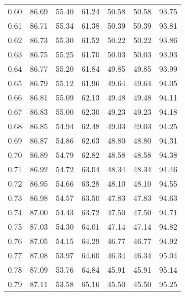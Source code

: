 \begin{tabular}{|c|c|c|c|c|c|c|}
      0.60 &     86.69 &     55.40 &      61.24 &   50.58 &      50.58 &         93.75 \\
      0.61 &     86.71 &     55.34 &      61.38 &   50.39 &      50.39 &         93.81 \\
      0.62 &     86.73 &     55.30 &      61.52 &   50.22 &      50.22 &         93.86 \\
      0.63 &     86.75 &     55.25 &      61.70 &   50.03 &      50.03 &         93.93 \\
      0.64 &     86.77 &     55.20 &      61.84 &   49.85 &      49.85 &         93.99 \\
      0.65 &     86.79 &     55.12 &      61.96 &   49.64 &      49.64 &         94.05 \\
      0.66 &     86.81 &     55.09 &      62.13 &   49.48 &      49.48 &         94.11 \\
      0.67 &     86.83 &     55.00 &      62.30 &   49.23 &      49.23 &         94.18 \\
      0.68 &     86.85 &     54.94 &      62.48 &   49.03 &      49.03 &         94.25 \\
      0.69 &     86.87 &     54.86 &      62.63 &   48.80 &      48.80 &         94.31 \\
      0.70 &     86.89 &     54.79 &      62.82 &   48.58 &      48.58 &         94.38 \\
      0.71 &     86.92 &     54.72 &      63.04 &   48.34 &      48.34 &         94.46 \\
      0.72 &     86.95 &     54.66 &      63.28 &   48.10 &      48.10 &         94.55 \\
      0.73 &     86.98 &     54.57 &      63.50 &   47.83 &      47.83 &         94.63 \\
      0.74 &     87.00 &     54.43 &      63.72 &   47.50 &      47.50 &         94.71 \\
      0.75 &     87.03 &     54.30 &      64.01 &   47.14 &      47.14 &         94.82 \\
      0.76 &     87.05 &     54.15 &      64.29 &   46.77 &      46.77 &         94.92 \\
      0.77 &     87.08 &     53.97 &      64.60 &   46.34 &      46.34 &         95.04 \\
      0.78 &     87.09 &     53.76 &      64.84 &   45.91 &      45.91 &         95.14 \\
      0.79 &     87.11 &     53.58 &      65.16 &   45.50 &      45.50 &         95.25 \\

\end{tabular}
